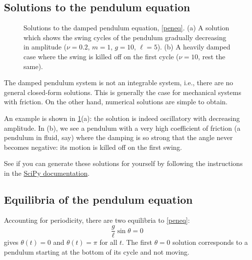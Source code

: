 \documentclass[main.tex]{subfiles}
\begin{document}
\subsection{Solutions to the pendulum equation}
\begin{figure}
\begin{subfigure}[t]{0.49\textwidth}
	\centering
	
\end{subfigure}
\begin{subfigure}[t]{0.49\textwidth}
	\centering
	
\end{subfigure}
\caption{Solutions to the damped pendulum equation, \cref{peneq}. (a) A solution which shows the swing cycles of the pendulum gradually decreasing in amplitude ($\nu=0.2$, $m=1$, $g=10$, $\ell=5$). (b) A heavily damped case where the swing is killed off on the first cycle ($\nu=10$, rest the same).}
\label{pensols}
\end{figure}
The damped pendulum system is not an integrable system, i.e., there are no general closed-form solutions. This is generally the case for mechanical systems with friction. On the other hand, numerical solutions are simple to obtain. 

An example is shown in \cref{pensols}(a): the solution is indeed oscillatory with decreasing amplitude. In (b), we see a pendulum with a very high coefficient of friction (a pendulum in fluid, say) where the damping is so strong that the angle never becomes negative: its motion is killed off on the first swing.

\begin{do-it-yourself}
	See if you can generate these solutions for yourself by following the instructions in the \href{https://docs.scipy.org/doc/scipy/reference/generated/scipy.integrate.odeint.html}{SciPy documentation}.
\end{do-it-yourself}

\subsection{Equilibria of the pendulum equation}
Accounting for periodicity, there are two equilibria to \cref{peneq}:
\begin{equation}
	\frac{g}{\ell}\sin\theta = 0
\end{equation}
gives $\theta(t) = 0$ and $\theta(t) = \pi$ for all $t$. The first $\theta=0$ solution corresponds to a pendulum starting at the bottom of its cycle and not moving. 
\end{document}
